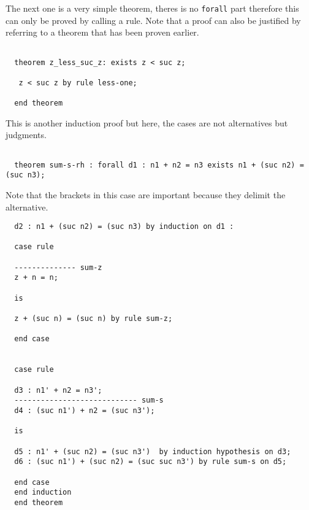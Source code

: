 \documentclass[12pt]{article}
\begin{document}
The next one is a very simple theorem, theres is no {\tt forall} part therefore this can only be proved by calling a rule. Note that a proof can also be justified by referring to a theorem 
that has been proven earlier.
\begin{verbatim}

  theorem z_less_suc_z: exists z < suc z; 

   z < suc z by rule less-one;

  end theorem
\end{verbatim}
This is another induction proof but here, the cases are not alternatives but judgments.
\begin{verbatim}

  theorem sum-s-rh : forall d1 : n1 + n2 = n3 exists n1 + (suc n2) = (suc n3);

\end{verbatim}
Note that the brackets in this case are important because they delimit the alternative.
\begin{verbatim}
  d2 : n1 + (suc n2) = (suc n3) by induction on d1 :

  case rule

  -------------- sum-z
  z + n = n;

  is

  z + (suc n) = (suc n) by rule sum-z;

  end case


  case rule

  d3 : n1' + n2 = n3';
  ---------------------------- sum-s
  d4 : (suc n1') + n2 = (suc n3');

  is

  d5 : n1' + (suc n2) = (suc n3')  by induction hypothesis on d3;
  d6 : (suc n1') + (suc n2) = (suc suc n3') by rule sum-s on d5;

  end case
  end induction
  end theorem
\end{verbatim}
\end{document}
